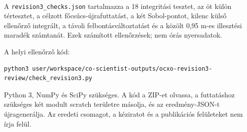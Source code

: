 \documentclass[10pt,a4paper]{article}
\begin{document}
{$$\par
\vspace{2pt}\par\vspace{0.5pt}
\par
A \texttt{revision3\_checks.json} tartalmazza a 18 integritási tesztet, az öt külön tértesztet, a célzott főcsúcs-újrafuttatást, a két Sobol-pontot, kilenc külső ellenőrző integrált, a távoli felbontásváltoztatást és a közölt 0,95 m-es illesztési maradék számtanát. Ezek számított ellenőrzések; nem órás nyersadatok.
\par
A helyi ellenőrző kód:
\par
\begin{verbatim}
python3 user/workspace/co-scientist-outputs/ocxo-revision3-review/check_revision3.py
\end{verbatim}
\par
Python 3, NumPy és SciPy szükséges. A kód a ZIP-et olvassa, a futtatáshoz szükséges két modult scratch területre másolja, és az eredmény-JSON-t újragenerálja. Az eredeti csomagot, a kéziratot és a publikációs felületeket nem írja felül.
}
\end{document}
